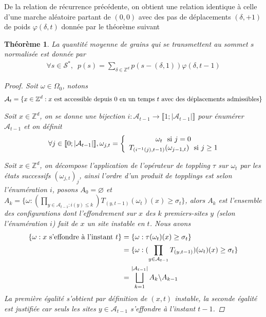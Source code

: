 \documentclass{article}
\newtheorem{theorem}{Théorème}[section]
\theoremstyle{definition}
\begin{document}
De la relation de récurrence précédente, on obtient une relation identique à celle d'une marche aléatoire partant de $(0,0)$ avec des pas de déplacements $(\delta, +1)$ de poids $\varphi(\delta, t)$ donnée par le théorème suivant
\begin{theorem}

	La quantité moyenne de grains qui se transmettent au sommet $s$ normalisée est donnée par
	\begin{align*}
	\forall s\in\mathcal{S}^*,\,\,\, p(s) = \sum_{\delta\in \mathbb{Z}^d}p(s-(\delta,1))\varphi(\delta,t-1)\end{align*} 
	\begin{proof}
		Soit $\omega \in\Omega_0$, notons \begin{align*}
		\mathcal{A}_t = \{x \in \mathbb{Z}^d : x \textup{ est accessible depuis } 0 \textup{ en un temps } t \textup{ avec des déplacements admissibles}\}\end{align*}
		
		Soit $x\in\mathbb{Z}^d$, on se donne une bijection $i : \mathcal{A}_{t-1} \to \llbracket 1;|\mathcal{A}_{t-1}|\rrbracket$ pour énumérer $\mathcal{A}_{t-1}$ et on définit
		\begin{align*}\forall j\in\llbracket 0;|\mathcal{A}_{t-1}|\rrbracket, \omega_{j,t} = 
			\left \{
\begin{array}{c @{} c}
	\omega_{t} \,\,\,\, \textup{si }j=0 \\
	T_{(i^{-1}(j),t-1)}(\omega_{j-1,t}) \,\,\,\, \textup{si }j\geq 1\\
\end{array}
\right.\end{align*}

Soit $x\in\mathbb{Z}^d$, on décompose l'application de l'opérateur de toppling $\tau$ sur $\omega_{t}$ par les états successifs $(\omega_{j,t})_j$, ainsi l'ordre d'un produit de topplings est selon l'énumération $i$, posons $A_0 = \varnothing$ et $A_k = \{\omega : (\prod_{y\in\mathcal{A}_{t-1} : i(y)\leq k}){T_{(y,t-1)}}(\omega_{t})(x)\geq \sigma_t\}$, alors $A_k$ est l'ensemble des configurations dont l'effondrement sur $x$ des $k$ premiers-sites $y$ (selon l'énumération $i$) fait de $x$ un site instable en $t$. Nous avons
	\begin{align*}
		\{\omega : x\textup{ s'effondre à l'instant } t\} &= \{\omega : \tau(\omega_t)(x)\geq \sigma_t\}\\
								  &=\{\omega : (\prod_{y\in \mathcal{A}_{t-1}} T_{(y,t-1)})(\omega_{t})(x)\geq \sigma_t\}\\
						    &= \bigsqcup_{k=1}^{|\mathcal{A}_{t-1}|}A_k\backslash A_{k-1}
						 \end{align*}
						 La première égalité s'obtient par définition de $(x,t)$ instable, la seconde égalité est justifiée car seuls les sites $y\in\mathcal{A}_{t-1}$ s'effondre à l'instant $t-1$.



\end{proof}
\end{theorem}
\end{document}
